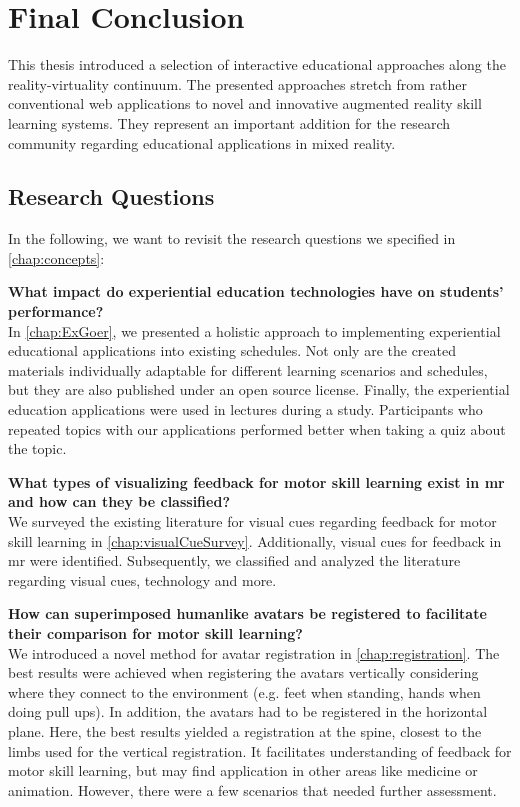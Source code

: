 %
\chapter{Final Conclusion}
\label{chap:conclusion}

This thesis introduced a selection of interactive educational approaches along the reality-virtuality continuum.
The presented approaches stretch from rather conventional web applications to novel and innovative augmented reality skill learning systems.
They represent an important addition for the research community regarding educational applications in mixed reality.

\section{Research Questions \label{sec:questions}}
In the following, we want to revisit the research questions we specified in \autoref{chap:concepts}:

\textbf{What impact do experiential education technologies have on students' performance?}\\
In \autoref{chap:ExGoer}, we presented a holistic approach to implementing experiential educational applications into existing schedules.
Not only are the created materials individually adaptable for different learning scenarios and schedules, but they are also published under an open source license.
Finally, the experiential education applications were used in lectures during a study.
Participants who repeated topics with our applications performed better when taking a quiz about the topic.

\textbf{What types of visualizing feedback for motor skill learning exist in \acrlong{mr} and how can they be classified?}\\
We surveyed the existing literature for visual cues regarding feedback for motor skill learning in \autoref{chap:visualCueSurvey}.
Additionally, visual cues for feedback in \acrshort{mr} were identified.
Subsequently, we classified and analyzed the literature regarding visual cues, technology and more.

\textbf{How can superimposed humanlike avatars be registered to facilitate their comparison for motor skill learning?}\\
We introduced a novel method for avatar registration in \autoref{chap:registration}.
The best results were achieved when registering the avatars vertically considering where they connect to the environment (e.g. feet when standing, hands when doing pull ups).
In addition, the avatars had to be registered in the horizontal plane.
Here, the best results yielded a registration at the spine, closest to the limbs used for the vertical registration.
It facilitates understanding of feedback for motor skill learning, but may find application in other areas like medicine or animation.
However, there were a few scenarios that needed further assessment.

